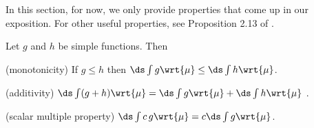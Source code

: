 \documentclass{article} %
\begin{document}


%
%	
%


In this section, for now, we only provide properties that come up in our exposition.  For other useful properties, see Proposition 2.13 of \cite{folland1999real}.


\begin{proposition} 
Let $g$ and $h$  be simple functions.  Then 
\begin{alphabate}
\item (monotonicity) If $g \leq h$ then $\ds\int g \wrt{\mu} \leq \ds\int h \wrt{\mu}$.
\item (additivity) $\ds\int (g + h) \wrt{\mu} = \ds\int g \wrt{\mu} + \ds\int h \wrt{\mu}$ .
\item (scalar multiple property) $\ds\int c \, g \wrt{\mu} = c \ds\int g \wrt{\mu}$.
\end{alphabate}
\label{prop:properties_of_integrals_of_simple_functions}
\end{proposition}
\end{document}
